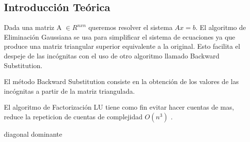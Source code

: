 \subsection{Introducción Teórica}

Dada una matriz A $\in R^{nxn}$ queremos resolver el sistema $Ax = b$. El algoritmo de Eliminación Gaussiana se usa para simplificar el sistema de ecuaciones ya que produce una matriz triangular superior equivalente a la original. Esto facilita el despeje de las incógnitas con el uso de otro algoritmo llamado Backward Substitution.

El método Backward Substitution consiste en la obtención de los valores de las incógnitas a partir de la matriz triangulada.

El algoritmo de Factorización LU tiene como fin evitar hacer cuentas de mas, reduce la repeticion de cuentas de complejidad $O(n^{3})$ .

diagonal dominante


